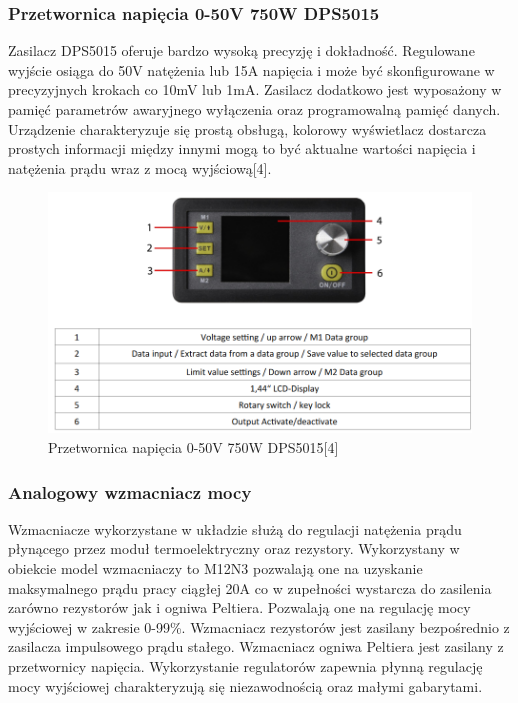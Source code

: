 \documentclass[oneside]{mgr}
\begin{document}
\subsubsection{Przetwornica napięcia 0-50V 750W DPS5015}

Zasilacz DPS5015 oferuje bardzo wysoką precyzję i dokładność. Regulowane wyjście osiąga do 50V natężenia lub 15A napięcia i może być skonfigurowane w precyzyjnych krokach co 10mV lub 1mA. Zasilacz dodatkowo jest wyposażony w pamięć parametrów awaryjnego wyłączenia oraz programowalną pamięć danych. Urządzenie charakteryzuje się prostą obsługą, kolorowy wyświetlacz dostarcza prostych informacji między innymi mogą to być aktualne wartości napięcia i natężenia prądu wraz z mocą wyjściową[4].

\begin{figure}
    \centering
    \includegraphics[width=\textwidth]{Przetwornica_napiecia.PNG}
    \caption{Przetwornica napięcia 0-50V 750W DPS5015[4]}
\end{figure}

\subsubsection{Analogowy wzmacniacz mocy}
Wzmacniacze wykorzystane w układzie służą do regulacji natężenia prądu płynącego przez moduł termoelektryczny oraz rezystory. Wykorzystany w obiekcie model wzmacniaczy to M12N3 pozwalają one na uzyskanie maksymalnego prądu pracy ciągłej 20A co w zupełności wystarcza do zasilenia zarówno rezystorów jak i ogniwa Peltiera. Pozwalają one na regulację mocy wyjściowej w zakresie 0-99\%. Wzmacniacz rezystorów jest zasilany bezpośrednio z zasilacza impulsowego prądu stałego. Wzmacniacz ogniwa Peltiera jest zasilany z przetwornicy napięcia. Wykorzystanie regulatorów zapewnia płynną regulację mocy wyjściowej charakteryzują się niezawodnością oraz małymi gabarytami. 
\end{document}

